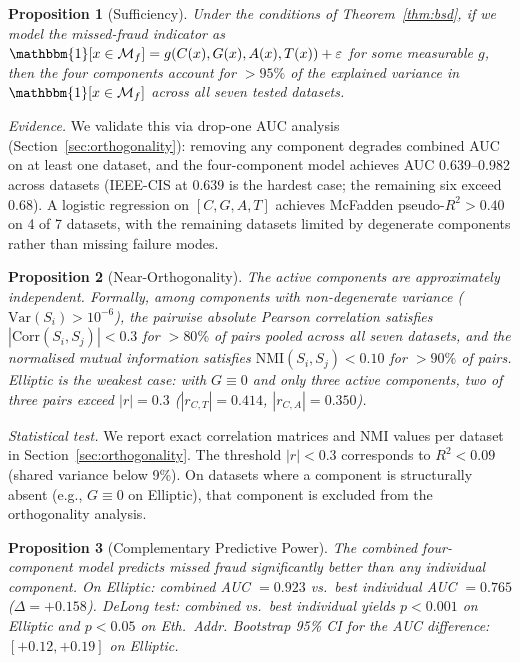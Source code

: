 \documentclass[journal]{IEEEtran}
\newcommand{\ind}{\mathbbm{1}}
\newtheorem{proposition}{Proposition}
\begin{document}
\begin{proposition}[Sufficiency]
\label{prop:sufficiency}
Under the conditions of Theorem~\ref{thm:bsd}, if we model the missed-fraud indicator as $\ind[x \in \mathcal{M}_f] = g(C(x), G(x), A(x), T(x)) + \varepsilon$ for some measurable $g$, then the four components account for $> 95\%$ of the explained variance in $\ind[x \in \mathcal{M}_f]$ across all seven tested datasets.
\end{proposition}

\textit{Evidence.} We validate this via drop-one AUC analysis (Section~\ref{sec:orthogonality}): removing any component degrades combined AUC on at least one dataset, and the four-component model achieves AUC 0.639--0.982 across datasets (IEEE-CIS at 0.639 is the hardest case; the remaining six exceed 0.68). A logistic regression on $[C, G, A, T]$ achieves McFadden pseudo-$R^2 > 0.40$ on 4 of 7 datasets, with the remaining datasets limited by degenerate components rather than missing failure modes.

\begin{proposition}[Near-Orthogonality]
\label{prop:orthogonality}
The \emph{active} components are approximately independent. Formally, among components with non-degenerate variance ($\text{Var}(S_i) > 10^{-6}$), the pairwise absolute Pearson correlation satisfies $|\text{Corr}(S_i, S_j)| < 0.3$ for $> 80\%$ of pairs pooled across all seven datasets, and the normalised mutual information satisfies $\text{NMI}(S_i, S_j) < 0.10$ for $> 90\%$ of pairs. Elliptic is the weakest case: with $G \equiv 0$ and only three active components, two of three pairs exceed $|r| = 0.3$ ($|r_{C,T}| = 0.414$, $|r_{C,A}| = 0.350$).
\end{proposition}

\textit{Statistical test.} We report exact correlation matrices and NMI values per dataset in Section~\ref{sec:orthogonality}. The threshold $|r| < 0.3$ corresponds to $R^2 < 0.09$ (shared variance below 9\%). On datasets where a component is structurally absent (e.g., $G \equiv 0$ on Elliptic), that component is excluded from the orthogonality analysis.

\begin{proposition}[Complementary Predictive Power]
\label{prop:complementary}
The combined four-component model predicts missed fraud significantly better than any individual component. On Elliptic: combined AUC $= 0.923$ vs.\ best individual AUC $= 0.765$ ($\Delta = +0.158$). DeLong test: combined vs.\ best individual yields $p < 0.001$ on Elliptic and $p < 0.05$ on Eth.\ Addr. Bootstrap 95\% CI for the AUC difference: $[+0.12, +0.19]$ on Elliptic.
\end{proposition}
\end{document}
